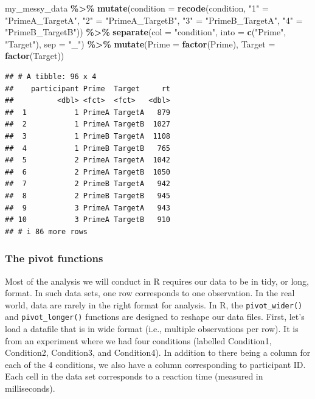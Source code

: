 \documentclass[
]{book}
\newenvironment{Shaded}{\begin{snugshade}}{\end{snugshade}}
\newcommand{\AttributeTok}[1]{\textcolor[rgb]{0.13,0.29,0.53}{#1}}
\newcommand{\FunctionTok}[1]{\textcolor[rgb]{0.13,0.29,0.53}{\textbf{#1}}}
\newcommand{\NormalTok}[1]{#1}
\newcommand{\OtherTok}[1]{\textcolor[rgb]{0.56,0.35,0.01}{#1}}
\newcommand{\SpecialCharTok}[1]{\textcolor[rgb]{0.81,0.36,0.00}{\textbf{#1}}}
\newcommand{\StringTok}[1]{\textcolor[rgb]{0.31,0.60,0.02}{#1}}
\begin{document}
\begin{Shaded}
\begin{Highlighting}[]
\NormalTok{my\_messy\_data }\SpecialCharTok{\%\textgreater{}\%} 
  \FunctionTok{mutate}\NormalTok{(}\AttributeTok{condition =} \FunctionTok{recode}\NormalTok{(condition,}
                            \StringTok{"1"} \OtherTok{=} \StringTok{"PrimeA\_TargetA"}\NormalTok{,}
                            \StringTok{"2"} \OtherTok{=} \StringTok{"PrimeA\_TargetB"}\NormalTok{, }
                            \StringTok{"3"} \OtherTok{=} \StringTok{"PrimeB\_TargetA"}\NormalTok{, }
                            \StringTok{"4"} \OtherTok{=} \StringTok{"PrimeB\_TargetB"}\NormalTok{)) }\SpecialCharTok{\%\textgreater{}\%}
  \FunctionTok{separate}\NormalTok{(}\AttributeTok{col =} \StringTok{"condition"}\NormalTok{, }\AttributeTok{into =} \FunctionTok{c}\NormalTok{(}\StringTok{"Prime"}\NormalTok{, }\StringTok{"Target"}\NormalTok{), }\AttributeTok{sep =} \StringTok{"\_"}\NormalTok{) }\SpecialCharTok{\%\textgreater{}\%}
  \FunctionTok{mutate}\NormalTok{(}\AttributeTok{Prime =} \FunctionTok{factor}\NormalTok{(Prime), }\AttributeTok{Target =} \FunctionTok{factor}\NormalTok{(Target))}
\end{Highlighting}
\end{Shaded}

\begin{verbatim}
## # A tibble: 96 x 4
##    participant Prime  Target     rt
##          <dbl> <fct>  <fct>   <dbl>
##  1           1 PrimeA TargetA   879
##  2           1 PrimeA TargetB  1027
##  3           1 PrimeB TargetA  1108
##  4           1 PrimeB TargetB   765
##  5           2 PrimeA TargetA  1042
##  6           2 PrimeA TargetB  1050
##  7           2 PrimeB TargetA   942
##  8           2 PrimeB TargetB   945
##  9           3 PrimeA TargetA   943
## 10           3 PrimeA TargetB   910
## # i 86 more rows
\end{verbatim}

\hypertarget{the-pivot-functions}{%
\subsubsection*{The pivot functions}\label{the-pivot-functions}}

Most of the analysis we will conduct in R requires our data to be in tidy, or long, format. In such data sets, one row corresponds to one observation. In the real world, data are rarely in the right format for analysis. In R, the \texttt{pivot\_wider()} and \texttt{pivot\_longer()} functions are designed to reshape our data files. First, let's load a datafile that is in wide format (i.e., multiple observations per row). It is from an experiment where we had four conditions (labelled Condition1, Condition2, Condition3, and Condition4). In addition to there being a column for each of the 4 conditions, we also have a column corresponding to participant ID. Each cell in the data set corresponds to a reaction time (measured in milliseconds).
\end{document}
